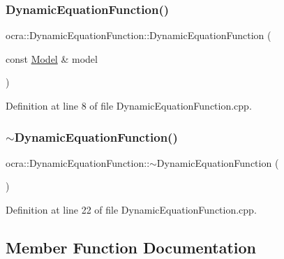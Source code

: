 \subsubsection{\texorpdfstring{Dynamic\+Equation\+Function()}{DynamicEquationFunction()}}
{\footnotesize\ttfamily ocra\+::\+Dynamic\+Equation\+Function\+::\+Dynamic\+Equation\+Function (\begin{DoxyParamCaption}\item[{const \hyperlink{classocra_1_1Model}{Model} \&}]{model }\end{DoxyParamCaption})}



Definition at line 8 of file Dynamic\+Equation\+Function.\+cpp.

\hypertarget{classocra_1_1DynamicEquationFunction_a84c82f21c1564aaca6b5aa703ecae73e}{}\label{classocra_1_1DynamicEquationFunction_a84c82f21c1564aaca6b5aa703ecae73e} 
\subsubsection{\texorpdfstring{$\sim$\+Dynamic\+Equation\+Function()}{~DynamicEquationFunction()}}
{\footnotesize\ttfamily ocra\+::\+Dynamic\+Equation\+Function\+::$\sim$\+Dynamic\+Equation\+Function (\begin{DoxyParamCaption}{ }\end{DoxyParamCaption})}



Definition at line 22 of file Dynamic\+Equation\+Function.\+cpp.



\subsection{Member Function Documentation}
\hypertarget{classocra_1_1DynamicEquationFunction_a6fc52fcd947fa303e55729dbb286b92c}{}\label{classocra_1_1DynamicEquationFunction_a6fc52fcd947fa303e55729dbb286b92c} 
